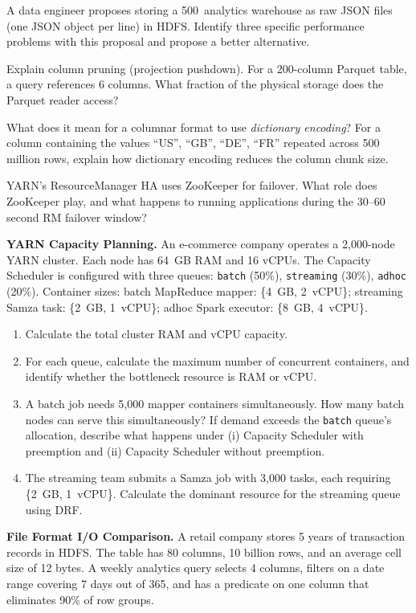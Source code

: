 \sq A data engineer proposes storing a 500\TB\ analytics warehouse as
raw JSON files (one JSON object per line) in HDFS. Identify three
specific performance problems with this proposal and propose a better
alternative.

\sq Explain column pruning (projection pushdown). For a 200-column
Parquet table, a query references 6 columns. What fraction of the
physical storage does the Parquet reader access?

\sq What does it mean for a columnar format to use \emph{dictionary
encoding}? For a column containing the values ``US'', ``GB'', ``DE'',
``FR'' repeated across 500 million rows, explain how dictionary encoding
reduces the column chunk size.

\sq YARN's ResourceManager HA uses ZooKeeper for failover. What role
does ZooKeeper play, and what happens to running applications during
the 30--60 second RM failover window?

\bigskip
{}

\ap \textbf{YARN Capacity Planning.}
An e-commerce company operates a 2{,}000-node YARN cluster. Each node
has 64~GB RAM and 16 vCPUs. The Capacity Scheduler is configured with
three queues: \texttt{batch} (50\%), \texttt{streaming} (30\%),
\texttt{adhoc} (20\%). Container sizes: batch MapReduce mapper:
\{4~GB, 2~vCPU\}; streaming Samza task: \{2~GB, 1~vCPU\}; adhoc Spark
executor: \{8~GB, 4~vCPU\}.

\begin{enumerate}[label=(\alph*)]
  \item Calculate the total cluster RAM and vCPU capacity.
  \item For each queue, calculate the maximum number of concurrent
        containers, and identify whether the bottleneck resource is
        RAM or vCPU.
  \item A batch job needs 5{,}000 mapper containers simultaneously.
        How many batch nodes can serve this simultaneously? If demand
        exceeds the \texttt{batch} queue's allocation, describe what
        happens under (i) Capacity Scheduler with preemption and
        (ii) Capacity Scheduler without preemption.
  \item The streaming team submits a Samza job with 3{,}000 tasks,
        each requiring \{2~GB, 1~vCPU\}. Calculate the dominant
        resource for the streaming queue using DRF.
\end{enumerate}

\ap \textbf{File Format I/O Comparison.}
A retail company stores 5 years of transaction records in HDFS. The
table has 80 columns, 10 billion rows, and an average cell size of
12 bytes. A weekly analytics query selects 4 columns, filters on a
date range covering 7 days out of 365, and has a predicate on one
column that eliminates 90\% of row groups.

